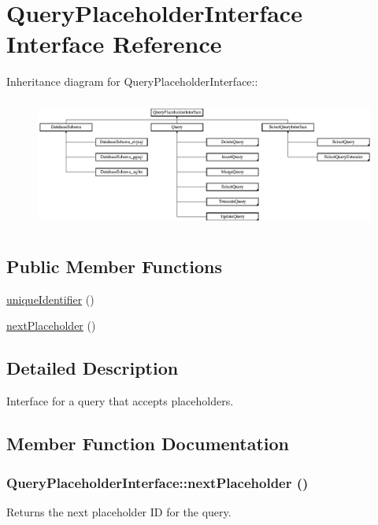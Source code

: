 \hypertarget{interfaceQueryPlaceholderInterface}{
\section{QueryPlaceholderInterface Interface Reference}
\label{interfaceQueryPlaceholderInterface}
}
Inheritance diagram for QueryPlaceholderInterface::\begin{figure}[H]
\begin{center}
\leavevmode
\includegraphics[height=4.29119cm]{interfaceQueryPlaceholderInterface}
\end{center}
\end{figure}
\subsection*{Public Member Functions}
\begin{DoxyCompactItemize}
\item 
\hyperlink{interfaceQueryPlaceholderInterface_a5f4eb118f1894f0b5785d78d4dbe9847}{uniqueIdentifier} ()
\item 
\hyperlink{interfaceQueryPlaceholderInterface_a6ec3008deb25380042178419cc601b37}{nextPlaceholder} ()
\end{DoxyCompactItemize}


\subsection{Detailed Description}
Interface for a query that accepts placeholders. 

\subsection{Member Function Documentation}
\hypertarget{interfaceQueryPlaceholderInterface_a6ec3008deb25380042178419cc601b37}{
\subsubsection[{nextPlaceholder}]{\setlength{\rightskip}{0pt plus 5cm}QueryPlaceholderInterface::nextPlaceholder ()}}
\label{interfaceQueryPlaceholderInterface_a6ec3008deb25380042178419cc601b37}
Returns the next placeholder ID for the query.

